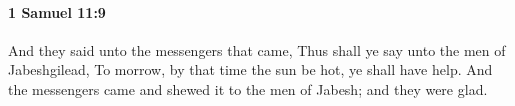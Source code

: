 
		\paragraph{1 Samuel 11:9} %
			\label{1SAMUEL-11-9}

			And they said unto the messengers that came, Thus shall ye say unto the men of Jabeshgilead, To morrow, by that time the sun be hot, ye shall have help. And the messengers came and shewed it to the men of Jabesh; and they were glad.


